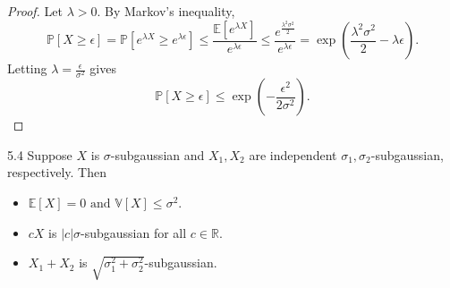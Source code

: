 \documentclass[10pt]{article}
\newenvironment{lemma*}[1]{%
  \IfBlankTF{#1}
    {\renewcommand{\themanuallemmainner}{\unskip}}
    {\renewcommand\themanuallemmainner{#1}}%
  \manuallemmainner
}{\endmanuallemmainner}
\theoremstyle{definition}
\begin{document}
\begin{proof}
    Let $\lambda > 0$. By Markov's inequality,
    \begin{equation*}
        \mathbb{P}[X \geq \epsilon] = \mathbb{P}[e^{\lambda X} \geq e^{\lambda \epsilon}] \leq \frac{\mathbb{E}[e^{\lambda X}]}{e^{\lambda \epsilon}} \leq \frac{e^{\frac{\lambda^2 \sigma^2}{2}}}{e^{\lambda \epsilon}} = \exp\left(\frac{\lambda^2 \sigma^2}{2} - \lambda \epsilon\right).
    \end{equation*}
    Letting $\lambda = \frac{\epsilon}{\sigma^2}$ gives
    \begin{equation*}
        \mathbb{P}[X \geq \epsilon] \leq \exp\left(-\frac{\epsilon^2}{2\sigma^2}\right).
    \end{equation*}
\end{proof}

\begin{lemma*}{5.4}
    Suppose $X$ is $\sigma$-subgaussian and $X_1, X_2$ are independent $\sigma_1, \sigma_2$-subgaussian, respectively.
    Then
    \begin{itemize}
        \item[(a)] $\mathbb{E}[X] = 0 \text{ and } \mathbb{V}[X] \leq \sigma^2$.
        \item[(b)] $cX$ is $|c|\sigma$-subgaussian for all $c \in \mathbb{R}$.
        \item[(c)] $X_1 + X_2$ is $\sqrt{\sigma_1^2 + \sigma_2^2}$-subgaussian.
    \end{itemize}
\end{lemma*}
\end{document}
